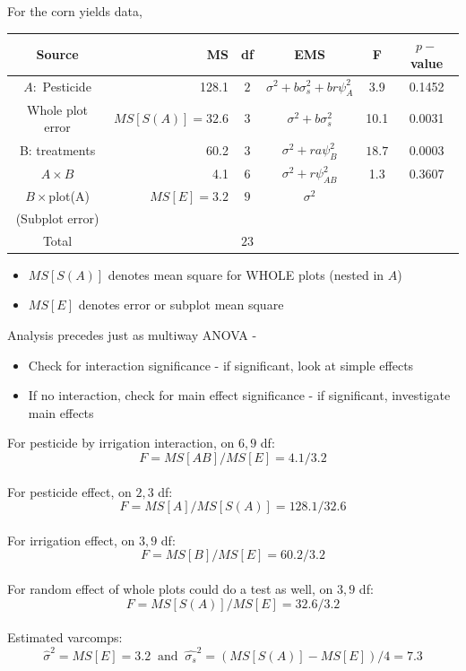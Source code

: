 For the corn yields data,
\begin{center}
\begin{tabular}{crcccc}  \hline
Source & MS & df & EMS & F & $p-$value\\ \hline
$A:$ Pesticide & 128.1 & $2$ & $\sigma^2 + b \sigma_s^2 + br \psi_A^2$ & 3.9 & 0.1452\\
Whole plot error & $MS[S(A)]=32.6$ & $3$ & $\sigma^2 + b \sigma_s^2$ & 10.1 & 0.0031\\
B: treatments & 60.2 & $3$ & $\sigma^2 + ra \psi_B^2$ & $18.7$ & 0.0003\\ 
$A\times B$ & 4.1 & $6$ & $\sigma^2 + r \psi_{AB}^2$ & 1.3 & 0.3607 \\ 
$B\times $plot(A) & $MS[E]=3.2$ & $9$ & $\sigma^2$  \\
(Subplot error) & \\ \hline
Total & & $23$\\ \hline
\end{tabular}
\end{center}
\bigkn

\begin{itemize}
\item $MS[S(A)]$ denotes mean square for WHOLE plots (nested in $A$) 
\item $MS[E]$ denotes error or subplot mean square 
\end{itemize}

\newpage
Analysis precedes just as multiway ANOVA - 
\begin{itemize}
\item Check for interaction significance - if significant, look at simple effects
\item If no interaction, check for main effect significance - if significant, investigate main effects
\end{itemize}

For pesticide by irrigation interaction, on $6,9$ df:
$$F=MS[AB]/MS[E]=4.1/3.2$$~\\

For pesticide effect, on $2,3$ df:
$$F=MS[A]/MS[S(A)]=128.1/32.6$$ ~\\

For irrigation effect, on $3,9$ df:
$$F=MS[B]/MS[E]=60.2/3.2$$ ~\\

For random effect of whole plots could do a test as well, on $3,9$ df:
$$F=MS[S(A)]/MS[E]=32.6/3.2$$ ~\\

Estimated varcomps: 
$$\hat{\sigma}^2=MS[E]=3.2\ \mbox{ and }\ \hat{\sigma_s}^2=(MS[S(A)]-MS[E])/4=7.3$$


